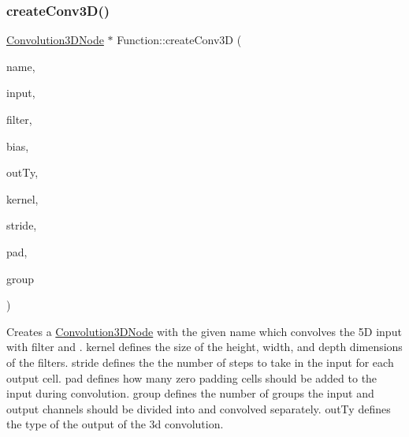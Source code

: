 \subsubsection{\texorpdfstring{create\+Conv3\+D()}{createConv3D()}\hspace{0.1cm}{\footnotesize\ttfamily [2/4]}}
{\footnotesize\ttfamily \hyperlink{classglow_1_1_convolution3_d_node}{Convolution3\+D\+Node} $\ast$ Function\+::create\+Conv3D (\begin{DoxyParamCaption}\item[{llvm\+::\+String\+Ref}]{name,  }\item[{\hyperlink{structglow_1_1_node_value}{Node\+Value}}]{input,  }\item[{\hyperlink{structglow_1_1_node_value}{Node\+Value}}]{filter,  }\item[{\hyperlink{structglow_1_1_node_value}{Node\+Value}}]{bias,  }\item[{\hyperlink{structglow_1_1_type}{Type\+Ref}}]{out\+Ty,  }\item[{\hyperlink{namespaceglow_a0ca574644e1e42ef193a9947fb4d8911}{unsigned\+\_\+t}}]{kernel,  }\item[{\hyperlink{namespaceglow_a0ca574644e1e42ef193a9947fb4d8911}{unsigned\+\_\+t}}]{stride,  }\item[{\hyperlink{namespaceglow_a0ca574644e1e42ef193a9947fb4d8911}{unsigned\+\_\+t}}]{pad,  }\item[{\hyperlink{namespaceglow_a0ca574644e1e42ef193a9947fb4d8911}{unsigned\+\_\+t}}]{group }\end{DoxyParamCaption})}

Creates a \hyperlink{classglow_1_1_convolution3_d_node}{Convolution3\+D\+Node} with the given {\ttfamily name} which convolves the 5D {\ttfamily input} with {\ttfamily filter} and . {\ttfamily kernel} defines the size of the height, width, and depth dimensions of the filters. {\ttfamily stride} defines the the number of steps to take in the input for each output cell. {\ttfamily pad} defines how many zero padding cells should be added to the input during convolution. {\ttfamily group} defines the number of groups the input and output channels should be divided into and convolved separately. {\ttfamily out\+Ty} defines the type of the output of the 3d convolution. \mbox{\label{classglow_1_1_function_aaad3ec8a2afa0bcfcb21a55719f3df4f}} 
